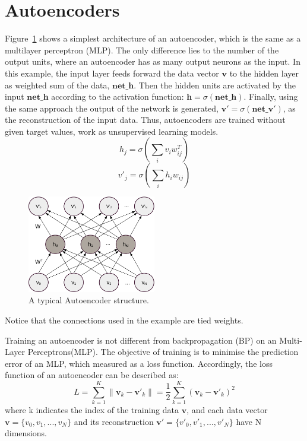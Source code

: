 \section{Autoencoders}
Figure~\ref{fig:AE} shows a simplest architecture of an autoencoder, which is the same as a multilayer perceptron (MLP).
The only difference lies to the number of the output units, where an autoencoder has as many output neurons as the input.
In this example, the input layer feeds forward the data vector $\mathbf{v}$ to the hidden layer as weighted sum of the data, $\mathbf{net\_h}$.
Then the hidden units are activated by the input $\mathbf{net\_h}$ according to the activation function: $\mathbf{h}=\sigma(\mathbf{net\_h})$.
Finally, using the same approach the output of the network is generated, $\mathbf{v'}=\sigma(\mathbf{net\_v'})$, as the reconstruction of the input data.
Thus, autoencoders are trained without given target values, work as unsupervised learning models.
\begin{equation}
h_j=\sigma(\sum_i v_i w^T_{ij})
\end{equation}
\begin{equation}
v'_j=\sigma(\sum_i h_i w_{ij})
\end{equation}
	
\begin{figure}
	\centering
	\includegraphics[width=0.5\textwidth]{pics_sdlm/AE.pdf}
	\caption{A typical Autoencoder structure.}
	\label{fig:AE}
\end{figure}

Notice that the connections used in the example are tied weights.

Training an autoencoder is not different from backpropagation (BP) on an Multi-Layer Perceptrons(MLP).
The objective of training is to minimise the prediction error of an MLP, which measured as a loss function.
Accordingly, the loss function of an autoencoder can be described as:
\begin{equation}
L=\sum_{k=1}^{K}\|\mathbf{v}_{k}-\mathbf{v'}_{k}\|=\frac{1}{2}\sum_{k=1}^{K}(\mathbf{v}_{k}-\mathbf{v'}_{k})^{2}
\end{equation}
where k indicates the index of the training data $\mathbf{v}$, and each data vector $\mathbf{v}=\{v_0, v_1,...,v_N\}$ and its reconstruction $\mathbf{v'}=\{v'_0, v'_1,...,v'_N\}$ have N dimensions. 

